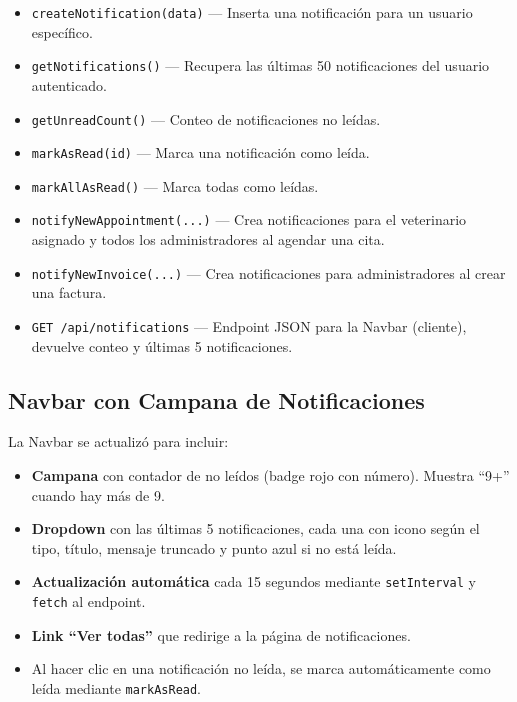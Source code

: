 \documentclass[12pt,a4paper]{article}
\begin{document}
\begin{itemize}[leftmargin=*]
    \item \texttt{createNotification(data)} --- Inserta una notificación para un
          usuario específico.
    \item \texttt{getNotifications()} --- Recupera las últimas 50 notificaciones
          del usuario autenticado.
    \item \texttt{getUnreadCount()} --- Conteo de notificaciones no leídas.
    \item \texttt{markAsRead(id)} --- Marca una notificación como leída.
    \item \texttt{markAllAsRead()} --- Marca todas como leídas.
    \item \texttt{notifyNewAppointment(...)} --- Crea notificaciones para el
          veterinario asignado y todos los administradores al agendar una cita.
    \item \texttt{notifyNewInvoice(...)} --- Crea notificaciones para
          administradores al crear una factura.
    \item \texttt{GET /api/notifications} --- Endpoint JSON para la Navbar
          (cliente), devuelve conteo y últimas 5 notificaciones.
\end{itemize}

\subsection{Navbar con Campana de Notificaciones}

La Navbar se actualizó para incluir:

\begin{itemize}[leftmargin=*]
    \item \textbf{Campana} con contador de no leídos (badge rojo con número).
          Muestra ``9+'' cuando hay más de 9.
    \item \textbf{Dropdown} con las últimas 5 notificaciones, cada una con
          icono según el tipo, título, mensaje truncado y punto azul si no
          está leída.
    \item \textbf{Actualización automática} cada 15 segundos mediante
          \texttt{setInterval} y \texttt{fetch} al endpoint.
    \item \textbf{Link ``Ver todas''} que redirige a la página de notificaciones.
    \item Al hacer clic en una notificación no leída, se marca automáticamente
          como leída mediante \texttt{markAsRead}.
\end{itemize}
\end{document}
